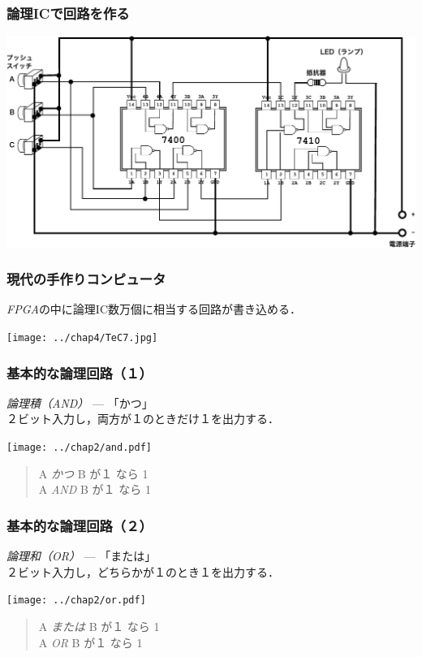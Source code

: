 \documentclass{beamer}                 %
\begin{document}
\begin{frame}
  \frametitle{論理ICで回路を作る}
  \centerline{\includegraphics[scale=0.6]{../chap2/majority-crop.pdf}}
\end{frame}

\begin{frame}
  \frametitle{現代の手作りコンピュータ}
  \emph{FPGA}の中に論理IC数万個に相当する回路が書き込める．
  \vfill
  \centerline{\texttt{[image: ../chap4/TeC7.jpg]}}
\end{frame}

\begin{frame}
  \frametitle{基本的な論理回路（１）}
  \emph{論理積（AND）} --- 「かつ」\\
  \vfill
  ２ビット入力し，両方が１のときだけ１を出力する．
  \begin{center}
    \texttt{[image: ../chap2/and.pdf]}
  \end{center}
  \begin{quote}
    A \emph{かつ} B が１ なら 1\\
    A \emph{AND} B が１ なら 1
  \end{quote}
\end{frame}

\begin{frame}
  \frametitle{基本的な論理回路（２）}
  \emph{論理和（OR）} --- 「または」\\
  \vfill
  ２ビット入力し，どちらかが１のとき１を出力する．
  \begin{center}
    \texttt{[image: ../chap2/or.pdf]}
  \end{center}
  \begin{quote}
    A \emph{または} B が１ なら 1\\
    A \emph{OR} B が１ なら 1
  \end{quote}
\end{frame}
\end{document}
